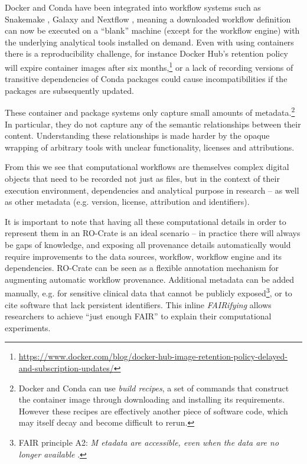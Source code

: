 \documentclass[ds,v1.1.2,openaccess]{iosart2x}%
\begin{document}
Docker and Conda have been integrated into workflow systems such as
Snakemake \cite{doi:10.1093/bioinformatics/bts480}, Galaxy
\cite{doi:10.1093/nar/gky379} and Nextflow \cite{doi:10.1038/nbt.3820}, meaning
a downloaded workflow definition can now be executed on a ``blank''
machine (except for the workflow engine) with the underlying analytical
tools installed on demand. Even with using containers there is a
reproducibility challenge, for instance Docker Hub's retention policy
will expire container images after six
months,\footnote{\url{https://www.docker.com/blog/docker-hub-image-retention-policy-delayed-and-subscription-updates/}}
or a lack of recording versions of transitive dependencies of Conda
packages could cause incompatibilities if the packages are subsequently updated.

These container and package systems only capture small amounts of
metadata.\footnote{Docker and Conda can use \textit{build recipes}, a set of commands
that construct the container image through downloading and installing
its requirements. However these recipes are effectively another piece
of software code, which may itself decay and become difficult to rerun.} In particular, they do not capture any of the semantic
relationships between their content. Understanding these relationships
is made harder by the opaque wrapping of arbitrary tools with unclear
functionality, licenses and attributions.

From this we see that computational workflows are themselves complex
digital objects that need to be recorded not just as files, but in the
context of their execution environment, dependencies and analytical
purpose in research -- as well as other metadata (e.g. version,
license, attribution and identifiers).

It is important to note that having all these computational details in
order to represent them in an RO-Crate is an ideal scenario -- in
practice there will always be gaps of knowledge, and exposing all
provenance details automatically would require improvements to the data
sources, workflow, workflow engine and its dependencies. RO-Crate can
be seen as a flexible annotation mechanism for augmenting automatic
workflow provenance. Additional metadata can be added manually, e.g.
for sensitive clinical data that cannot be publicly exposed\footnote{FAIR principle A2: \textit{M etadata are accessible, even when the
data are no longer available} \cite{doi:10.1038/sdata.2016.18}.}, or
to cite software that lack persistent identifiers. This inline
\textit{FAIRifying} allows researchers to achieve ``just enough FAIR'' to
explain their computational experiments.
\end{document}
